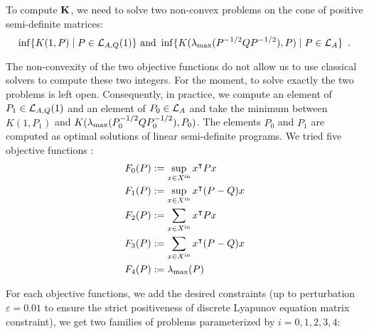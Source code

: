 \documentclass[10pt]{article}
\begin{document}
To compute $\mathbf{K}$, we need to solve two non-convex problems on the cone of positive semi-definite matrices:
\[
\inf\{K(1,P)\mid P\in\mathcal{L}_{A,Q}(1)\} \text{ and }\inf\{K(\lambda_{\operatorname{max}}(P^{-1/2}QP^{-1/2}),P)\mid P\in\mathcal{L}_{A}\} \enspace.
\]

The non-convexity of the two objective functions do not allow us to use classical solvers to compute these two integers. For the moment, to solve exactly the two problems is left open. Consequently, in practice, we compute an element of $P_1\in\mathcal{L}_{A,Q}(1)$ and an element of $P_0\in\mathcal{L}_{A}$ and take the minimum between $K(1,P_1)$ and $K(\lambda_{\operatorname{max}}(P_0^{-1/2}QP_0^{-1/2}),P_0)$. The elements $P_0$ and $P_1$  are computed as optimal solutions of linear semi-definite programs. We tried five objective functions :
\begin{align}
&F_0(P):=\sup_{x\in X^\mathrm{in}} x^\intercal P x\label{objsdp:eq0}\\
&F_1(P):=\sup_{x\in X^\mathrm{in}} x^\intercal (P-Q) x\label{objsdp:eq1}\\
&F_2(P):=\sum_{x\in X^\mathrm{in}} x^\intercal P x\label{objsdp:eq2}\\
&F_3(P):=\sum_{x\in X^\mathrm{in}} x^\intercal (P-Q) x\label{objsdp:eq3}\\
&F_4(P):=\lambda_{\operatorname{max}}(P)\label{objsdp:eq4}
\end{align} 
%
%
%
%

For each objective functions, we add the desired constraints (up to perturbation $\varepsilon=0.01$ to ensure the strict positiveness of discrete Lyapunov equation matrix constraint), we get two families of problems parameterized by $i=0,1,2,3,4$:
\end{document}
